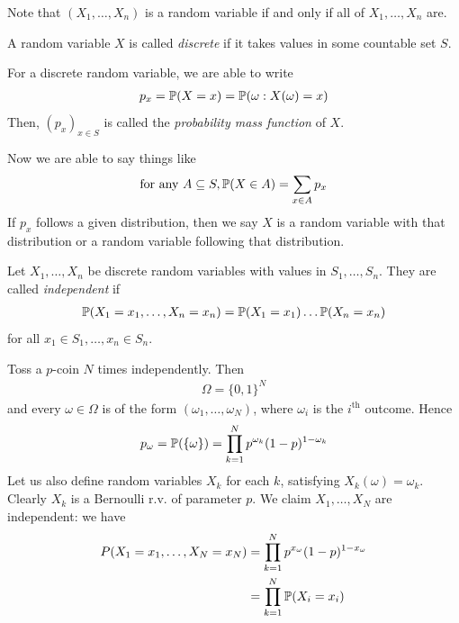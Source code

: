 \documentclass{../template/note}
\begin{document}
    Note that \((X_1, \dots, X_n)\) is a random variable if and only if all of \(X_1, \dots, X_n\) are.

    \begin{definition}
        A random variable \(X\) is called \emph{discrete} if it takes values in some countable set \(S\).
    \end{definition}
    
    \begin{definition}
        For a discrete random variable, we are able to write
        \begin{align*}
            p_x = \mathbb P(X = x) = \mathbb P({\omega: X(\omega) = x})
        \end{align*}
        Then, \((p_x)_{x \in S}\) is called the \emph{probability mass function} of \(X\).        
    \end{definition}
    
    Now we are able to say things like
    \begin{align*}
        \text{for any }A \subseteq S, \mathbb P(X \in A) = \sum_{x \in A}p_x
    \end{align*}
    If \(p_x\) follows a given distribution, then we say \(X\) is a random variable with that distribution or a random variable following that distribution.
    
    \begin{definition}
        Let \(X_1, \dots, X_n\) be discrete random variables with values in \(S_1, \dots, S_n\). They are called \emph{independent} if
        \begin{align*}
            \mathbb P(X_1 = x_1, \dots, X_n = x_n) = \mathbb P(X_1 = x_1) \dots \mathbb P(X_n = x_n)
        \end{align*}
        for all \(x_1 \in S_1, \dots, x_n \in S_n\).
    \end{definition}
    
    \begin{example}
        Toss a \(p\)-coin \(N\) times independently. Then
        \begin{align*}
            \Omega = \{0, 1\}^N
        \end{align*}
        and every \(\omega \in \Omega\) is of the form \((\omega_1, \dots, \omega_N)\), where \(\omega_i\) is the \(i^\text{th}\) outcome. Hence
        \begin{align*}
            p_{\omega} = \mathbb P(\{\omega\}) = \prod_{k=1}^N p^{\omega_k} (1-p)^{1-\omega_k}
        \end{align*}
        Let us also define random variables \(X_k\) for each \(k\), satisfying \(X_k(\omega) = \omega_k\). Clearly \(X_k\) is a Bernoulli r.v. of parameter \(p\). We claim \(X_1, \dots, X_N\) are independent: we have
        \begin{align*}
            P(X_1 = x_1, \dots, X_N = x_N) &= \prod_{k=1}^N p^{x_\omega}(1-p)^{1-x_\omega} \\
            &= \prod_{k=1}^N \mathbb P(X_i = x_i)
        \end{align*}
    \end{example}
\end{document}
